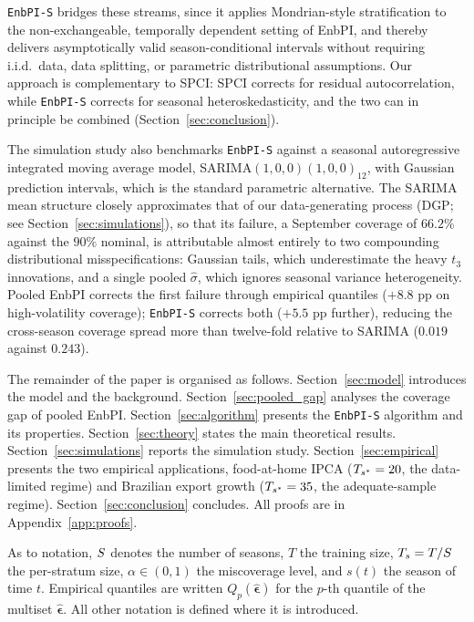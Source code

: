 \texttt{EnbPI-S} bridges these streams, since it applies
Mondrian-style stratification to the non-exchangeable, temporally
dependent setting of EnbPI, and thereby delivers asymptotically
valid season-conditional intervals without requiring i.i.d.\ data,
data splitting, or parametric distributional assumptions.  Our
approach is complementary to SPCI: SPCI corrects for residual
autocorrelation, while \texttt{EnbPI-S} corrects for seasonal
heteroskedasticity, and the two can in principle be combined
(Section~\ref{sec:conclusion}).

The simulation study also benchmarks \texttt{EnbPI-S} against a
seasonal autoregressive integrated moving average model,
SARIMA$(1,0,0)(1,0,0)_{12}$, with Gaussian prediction intervals,
which is the standard parametric alternative.  The SARIMA mean
structure closely approximates that of our data-generating process
(DGP; see Section~\ref{sec:simulations}), so that its failure, a
September coverage of $66.2\%$ against the $90\%$ nominal, is
attributable almost entirely to two compounding distributional
misspecifications: Gaussian tails, which underestimate the heavy
$t_3$ innovations, and a single pooled $\hat{\sigma}$, which ignores
seasonal variance heterogeneity.  Pooled EnbPI corrects the first
failure through empirical quantiles ($+8.8$ pp on high-volatility
coverage); \texttt{EnbPI-S} corrects both ($+5.5$ pp further),
reducing the cross-season coverage spread more than twelve-fold
relative to SARIMA ($0.019$ against $0.243$).

The remainder of the paper is organised as follows.
Section~\ref{sec:model} introduces the model and the background.
Section~\ref{sec:pooled_gap} analyses the coverage gap of pooled
EnbPI.  Section~\ref{sec:algorithm} presents the \texttt{EnbPI-S}
algorithm and its properties.  Section~\ref{sec:theory} states the
main theoretical results.  Section~\ref{sec:simulations} reports the
simulation study.  Section~\ref{sec:empirical} presents the two
empirical applications, food-at-home IPCA ($T_{s^*} = 20$, the
data-limited regime) and Brazilian export growth ($T_{s^*} = 35$, the
adequate-sample regime).  Section~\ref{sec:conclusion} concludes.
All proofs are in Appendix~\ref{app:proofs}.

As to notation, $S$ denotes the number of seasons, $T$ the
training size, $T_s = T/S$ the per-stratum size,
$\alpha \in (0,1)$ the miscoverage level, and $s(t)$ the season of
time $t$.  Empirical quantiles are written
$Q_p(\hat{\boldsymbol\epsilon})$ for the $p$-th quantile of the
multiset $\hat{\boldsymbol\epsilon}$.  All other notation is defined
where it is introduced.

